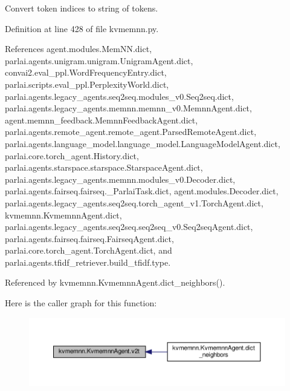 \begin{DoxyVerb}Convert token indices to string of tokens.\end{DoxyVerb}
 

Definition at line 428 of file kvmemnn.\+py.



References agent.\+modules.\+Mem\+N\+N.\+dict, parlai.\+agents.\+unigram.\+unigram.\+Unigram\+Agent.\+dict, convai2.\+eval\+\_\+ppl.\+Word\+Frequency\+Entry.\+dict, parlai.\+scripts.\+eval\+\_\+ppl.\+Perplexity\+World.\+dict, parlai.\+agents.\+legacy\+\_\+agents.\+seq2seq.\+modules\+\_\+v0.\+Seq2seq.\+dict, parlai.\+agents.\+legacy\+\_\+agents.\+memnn.\+memnn\+\_\+v0.\+Memnn\+Agent.\+dict, agent.\+memnn\+\_\+feedback.\+Memnn\+Feedback\+Agent.\+dict, parlai.\+agents.\+remote\+\_\+agent.\+remote\+\_\+agent.\+Parsed\+Remote\+Agent.\+dict, parlai.\+agents.\+language\+\_\+model.\+language\+\_\+model.\+Language\+Model\+Agent.\+dict, parlai.\+core.\+torch\+\_\+agent.\+History.\+dict, parlai.\+agents.\+starspace.\+starspace.\+Starspace\+Agent.\+dict, parlai.\+agents.\+legacy\+\_\+agents.\+memnn.\+modules\+\_\+v0.\+Decoder.\+dict, parlai.\+agents.\+fairseq.\+fairseq.\+\_\+\+Parlai\+Task.\+dict, agent.\+modules.\+Decoder.\+dict, parlai.\+agents.\+legacy\+\_\+agents.\+seq2seq.\+torch\+\_\+agent\+\_\+v1.\+Torch\+Agent.\+dict, kvmemnn.\+Kvmemnn\+Agent.\+dict, parlai.\+agents.\+legacy\+\_\+agents.\+seq2seq.\+seq2seq\+\_\+v0.\+Seq2seq\+Agent.\+dict, parlai.\+agents.\+fairseq.\+fairseq.\+Fairseq\+Agent.\+dict, parlai.\+core.\+torch\+\_\+agent.\+Torch\+Agent.\+dict, and parlai.\+agents.\+tfidf\+\_\+retriever.\+build\+\_\+tfidf.\+type.



Referenced by kvmemnn.\+Kvmemnn\+Agent.\+dict\+\_\+neighbors().

Here is the caller graph for this function\+:
\nopagebreak
\begin{figure}[H]
\begin{center}
\leavevmode
\includegraphics[width=350pt]{classkvmemnn_1_1KvmemnnAgent_a781d63f517c888a8e64fedebed676d2b_icgraph}
\end{center}
\end{figure}
\mbox{\label{classkvmemnn_1_1KvmemnnAgent_ae907d1e9d3b1ce9708d40b905d4888f5}} 
